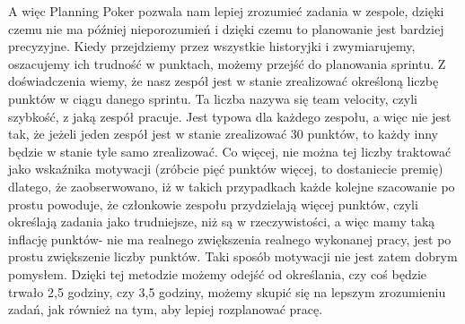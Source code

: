 A więc Planning Poker pozwala nam lepiej zrozumieć zadania w zespole, dzięki czemu nie ma później nieporozumień i dzięki czemu to planowanie jest bardziej precyzyjne.
Kiedy przejdziemy przez wszystkie historyjki i zwymiarujemy, oszacujemy ich trudność w punktach, możemy przejść do planowania sprintu. Z doświadczenia wiemy, że nasz zespół jest w stanie zrealizować określoną liczbę punktów w ciągu danego sprintu.
Ta liczba nazywa się team velocity, czyli szybkość, z jaką zespół pracuje. Jest typowa dla każdego zespołu, a więc nie jest tak, że jeżeli jeden zespół jest w stanie zrealizować 30 punktów, to każdy inny będzie w stanie tyle samo zrealizować.
Co więcej, nie można tej liczby traktować jako wskaźnika motywacji (zróbcie pięć punktów więcej, to dostaniecie premię) dlatego, że zaobserwowano, iż w takich przypadkach każde kolejne szacowanie po prostu powoduje, że członkowie zespołu przydzielają więcej punktów, czyli określają zadania jako trudniejsze, niż są w rzeczywistości, a więc mamy taką inflację punktów- nie ma realnego zwiększenia realnego wykonanej pracy, jest po prostu zwiększenie liczby punktów. Taki sposób motywacji nie jest zatem dobrym pomysłem.
Dzięki tej metodzie możemy odejść od określania, czy coś będzie trwało 2,5 godziny, czy 3,5 godziny, możemy skupić się na lepszym zrozumieniu zadań, jak również na tym, aby lepiej rozplanować pracę.
